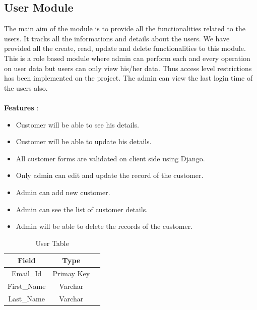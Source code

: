 \documentclass[12pt,a4paper]{report}
\begin{document}
\subsection{User Module}
\hspace{0.25cm}
\par
The main aim of the module is to provide all the functionalities related to the users. It tracks all the informations and details about the users. We have provided all the create, read, update and delete functionalities to this module. This is a role based module where admin can perform each and every operation on user data but users can only view his/her data. Thus access level restrictions has been implemented on the project. The admin can view the last login time of the users also.
\\
\\
\textbf{Features} :
\begin{itemize}
	\item Customer will be able to see his details.
	\item Customer will be able to update his details.
	\item All customer forms are validated on client side using Django.
	\item Only admin can edit and update the record of the customer.
	\item Admin can add new customer.
	\item Admin can see the list of customer details.
	\item Admin will be able to delete the records of the customer.
\end{itemize}

\begin{table}
  \begin{center}
    \begin{tabular}{ |c|c|c| } 
    \hline
    Field & Type  \\
    \hline
    Email\_Id & Primay Key \\
    \hline
    First\_Name & Varchar \\
    \hline
    Last\_Name & Varchar \\
    \hline
    \end{tabular}
    \caption{ User Table }
    \end{center}
  \end{table}
\end{document}
